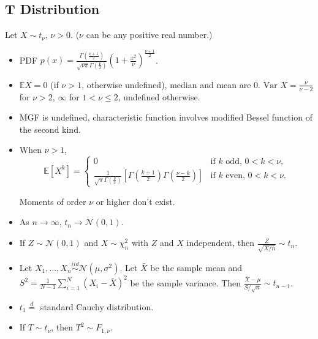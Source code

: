 \documentclass[twoside]{article}
\newcommand\bbE{\mathbb{E}}
\newcommand\calN{\mathcal{N}}
\newcommand\sg{\sigma}
\newcommand\goesto{\rightarrow}
\newcommand\var{\text{Var }}
\begin{document}
\subsection{T Distribution}
Let $X \sim t_\nu$, $\nu > 0$. ($\nu$ can be any positive real number.)
\begin{itemize}
\item PDF $p(x) = \displaystyle\frac{\Gamma\left(\frac{\nu + 1}{2} \right)}{\sqrt{\nu \pi}\Gamma \left(\frac{\nu}{2} \right)} \left( 1 + \frac{x^2}{\nu} \right)^{\frac{\nu + 1}{2}}$.

\item $\bbE X = 0$ (if $\nu > 1$, otherwise undefined), median and mean are 0. $\var X = \displaystyle\frac{\nu}{\nu-2}$ for $\nu > 2$, $\infty$ for $1 < \nu \leq 2$, undefined otherwise.

\item MGF is undefined, characteristic function involves modified Bessel function of the second kind.

\item When $\nu > 1$,
\begin{equation*}
\bbE [X^k] = \begin{cases} 0  &\text{if $k$ odd, $0 < k < \nu$,} \\ \displaystyle\frac{1}{\sqrt{\pi} \Gamma \left(\frac{\nu}{2} \right)} \left[ \Gamma \left(\frac{k+1}{2} \right)\Gamma \left( \frac{\nu - k}{2} \right) \right] &\text{if $k$ even, $0 < k < \nu$.} \end{cases}
\end{equation*}

Moments of order $\nu$ or higher don't exist.

\item As $n \goesto \infty$, $t_n \goesto \calN(0,1)$.

\item If $Z \sim \calN(0,1)$ and $X \sim \chi_n^2$ with $Z$ and $X$ independent, then $\displaystyle\frac{Z}{\sqrt{X / n}} \sim t_n$.

\item Let $X_1, \dots, X_n \stackrel{iid}{\sim} \calN(\mu, \sg^2)$. Let $\bar{X}$ be the sample mean and $S^2 = \displaystyle\frac{1}{N-1} \sum_{i=1}^N (X_i - \bar{X})^2$ be the sample variance. Then $\displaystyle\frac{\bar{X} - \mu}{S / \sqrt{n}} \sim t_{n-1}$.

\item $t_1 \stackrel{d}{=}$ standard Cauchy distribution.

\item If $T \sim t_\nu$, then $T^2 \sim F_{1, \nu}$.
\end{itemize}
\end{document}
